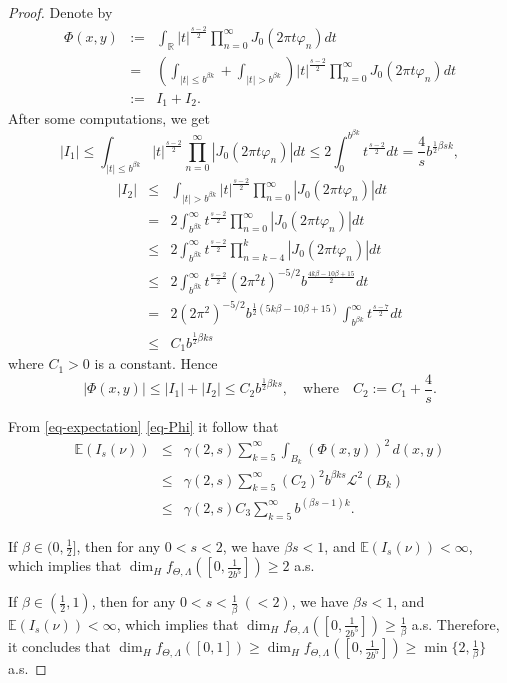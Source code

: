 \documentclass[12pt, reqno]{amsart}
\theoremstyle{plain}
\theoremstyle{definition}
\theoremstyle{remark}
\begin{document}
\begin{proof}
 	 Denote by
 	 \begin{eqnarray*}
 	 	\Phi(x,y) &:=& \int_{\mathbb{R}} |t|^{\frac{s-2}{2}} \prod_{n=0}^\infty J_0(2\pi t \varphi_n)dt \\
 	 	&=& \left(\int_{|t|\le b^{\beta k}}+\int_{|t|> b^{\beta k}}\right) |t|^{\frac{s-2}{2}} \prod_{n=0}^\infty J_0(2\pi t \varphi_n)dt  \\
 	 	&:=& I_1+I_2.
 	 \end{eqnarray*}
 	After some computations, we get
  $$|I_1|\le\int_{|t|\le b^{\beta k}}|t|^{\frac{s-2}{2}} \prod_{n=0}^\infty |J_0(2\pi t \varphi_n)|dt\le 2\int_{0}^{b^{\beta k}}t^{\frac{s-2}{2}}dt=\frac{4}{s} b^{\frac{1}{2}\beta sk},$$
 	\begin{eqnarray*} 
 	|I_2| &\le& \int_{|t|> b^{\beta k}}|t|^{\frac{s-2}{2}} \prod_{n=0}^\infty |J_0(2\pi t \varphi_n)|dt \\
 	&=& 2\int_{b^{\beta k}}^\infty t^{\frac{s-2}{2}} \prod_{n=0}^\infty |J_0(2\pi t \varphi_n)|dt \\
 	&\le& 2\int_{b^{\beta k}}^\infty t^{\frac{s-2}{2}} \prod_{n=k-4}^k |J_0(2\pi t \varphi_n)|dt \\
 	&\le& 2\int_{b^{\beta k}}^\infty t^{\frac{s-2}{2}}(2\pi^2t)^{-5/2}b^{\frac{4k\beta-10\beta+15}{2}} dt \\
 	&=& 2(2\pi^2)^{-5/2}b^{\frac{1}{2}(5k\beta-10\beta+15)}\int_{b^{\beta k}}^\infty t^{\frac{s-7}{2}} dt  \\
 	&\le& C_1 b^{\frac{1}{2} \beta ks}
 	  \end{eqnarray*}
 where $C_1>0$ is a constant.  Hence 
 \begin{equation}\label{eq-Phi}
 	 |\Phi(x,y)|\le |I_1|+|I_2|\le C_2 b^{\frac{1}{2} \beta ks}, \quad\text{where}\quad C_2 :=C_1+\frac 4s.
 \end{equation} 
 
 From \eqref{eq-expectation} \eqref{eq-Phi}  it follow that
  \begin{eqnarray*}
 	\mathbb{E}(I_s(\nu))&\le& \gamma(2,s) \sum_{k=5}^{\infty}\int_{B_k}(\Phi(x,y))^2 \, d(x,y) \\
 	&\le&  \gamma(2,s)\sum_{k=5}^{\infty} (C_2)^2 b^{\beta ks} \mathcal{L}^2(B_k) \\
 	&\le&  \gamma(2,s)C_3\sum_{k=5}^{\infty} b^{(\beta s-1)k}.
 \end{eqnarray*}
 
 If  $\beta\in (0, \frac12]$, then for any $0<s<2$, we have $\beta s<1$, and $\mathbb{E}(I_s(\nu))<\infty$, which implies that $\dim_H f_{\Theta,\Lambda}([0,\frac{1}{2b^5}])\ge 2$ a.s.
 
 If $\beta\in (\frac12, 1)$, then for any $0<s<\frac {1}{\beta} \  (<2)$, we have  $\beta s<1$, and $\mathbb{E}(I_s(\nu))<\infty$, which implies that $\dim_H f_{\Theta,\Lambda}([0,\frac{1}{2b^5}])\ge \frac{1}{\beta}$ a.s. Therefore, it concludes that  $\dim_H f_{\Theta,\Lambda}([0,1])\ge \dim_H f_{\Theta,\Lambda}([0,\frac{1}{2b^5}])\ge \min\{2, \frac{1}{\beta}\}$ a.s.
 \end{proof}
 
\end{document}
